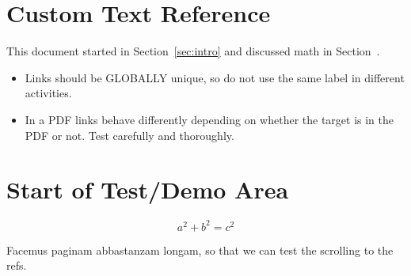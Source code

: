 \documentclass[landscape]{ximera}
\begin{document}
\section{Custom Text Reference}

This document started in Section~\ref{sec:intro} and discussed math in Section~.


\begin{remark}

    \begin{itemize}
        \item  Links should be GLOBALLY unique, so do not use the same label in different activities.
        \item  In a PDF links behave differently depending on whether the target is in the PDF or not. 
            Test carefully and thoroughly.
    \end{itemize}
\end{remark}


\section{Start of Test/Demo Area}

\begin{equation}
a^2 + b^2 = c^2    \label{eq:pyth2}
\end{equation}

Facemus paginam abbastanzam longam, so that we can test the scrolling to the refs.

\lipsum[1]

\lipsum[2]

\lipsum[3]

\lipsum[4]

\hrulefill
\end{document}
